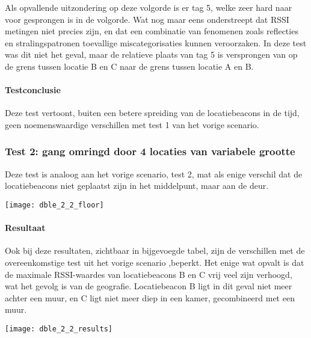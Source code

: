 Als opvallende uitzondering op deze volgorde is er tag 5, welke zeer hard naar voor gesprongen is in de volgorde. Wat nog maar eens onderstreept dat RSSI metingen niet precies zijn, en dat een combinatie van fenomenen zoals reflecties en stralingspatronen toevallige miscategorisaties kunnen veroorzaken. In deze test was dit niet het geval, maar de relatieve plaats van tag 5 is versprongen van op de grens tussen locatie B en C naar de grens tussen locatie A en B.

\paragraph{Testconclusie}
Deze test vertoont, buiten een betere spreiding van de locatiebeacons in de tijd, geen noemenswaardige verschillen met test 1 van het vorige scenario.

\subsubsection{Test 2: gang omringd door 4 locaties van variabele grootte}
\begin{minipage}{0.55\textwidth}
Deze test is analoog aan het vorige scenario, test 2, mat als enige verschil dat de locatiebeacons niet geplaatst zijn in het middelpunt, maar aan de deur.
\end{minipage}
\hfill
\begin{minipage}{0.42\textwidth}
	\texttt{[image: dble\_2\_2\_floor]}
	\label{fig:ond-ble-dynamic-2-2-ops}
\end{minipage}

\paragraph{Resultaat}
\begin{minipage}{0.42\textwidth}
Ook bij deze resultaten, zichtbaar in bijgevoegde tabel, zijn de verschillen met de overeenkomstige test uit het vorige scenario ,beperkt. Het enige wat opvalt is dat de maximale RSSI-waardes van locatiebeacons B en C vrij veel zijn verhoogd, wat het gevolg is van de geografie. Locatiebeacon B ligt in dit geval niet meer achter een muur, en C ligt niet meer diep in een kamer, gecombineerd met een muur. 
\end{minipage}
\hfill
\begin{minipage}{0.55\textwidth}
	\texttt{[image: dble\_2\_2\_results]}
	\label{fig:ond-ble-dynamic-2-2-res}
\end{minipage}


